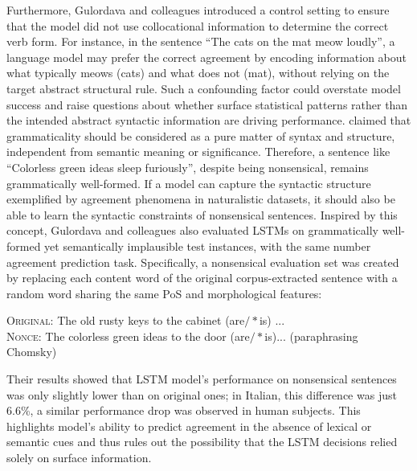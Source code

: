 Furthermore, Gulordava and colleagues introduced a control setting to ensure that the model did not use collocational information to determine the correct verb form. For instance, in the sentence “The cats on the mat meow loudly”, a language model may prefer the correct agreement by encoding information about what typically meows (cats) and what does not (mat), without relying on the target abstract structural rule. Such a confounding factor could overstate model success and raise questions about whether surface statistical patterns rather than the intended abstract syntactic information are driving performance. \cite{chomsky1957syntactic} claimed that grammaticality should be considered as a pure matter of syntax and structure, independent from semantic meaning or significance. Therefore, a sentence like ``Colorless green ideas sleep furiously'', despite being nonsensical, remains grammatically well-formed. If a model can capture the syntactic structure exemplified by agreement phenomena in naturalistic datasets, it should also be able to learn the syntactic constraints of nonsensical sentences. Inspired by this concept, Gulordava and colleagues also evaluated LSTMs on grammatically well-formed yet semantically implausible test instances, with the same number agreement prediction task.
Specifically, a nonsensical evaluation set was created by replacing each content word of the original corpus-extracted sentence with a random word sharing the same PoS and
morphological features:   
\begin{exe}
   \ex\label{ex:nonce_ex}
\textsc{Original}: The old rusty keys to the cabinet (are$/*$is) ...   \\
\textsc{Nonce}: The colorless green ideas to the door (are$/*$is)... (paraphrasing Chomsky)
\end{exe}
Their results showed that LSTM model's performance on nonsensical sentences was only slightly lower than on original ones; in Italian, this difference was just 6.6\%, a similar performance drop was observed in human subjects. This highlights model's ability to predict agreement in the absence of lexical or semantic cues and thus rules out the possibility that the LSTM decisions relied solely on surface information.

